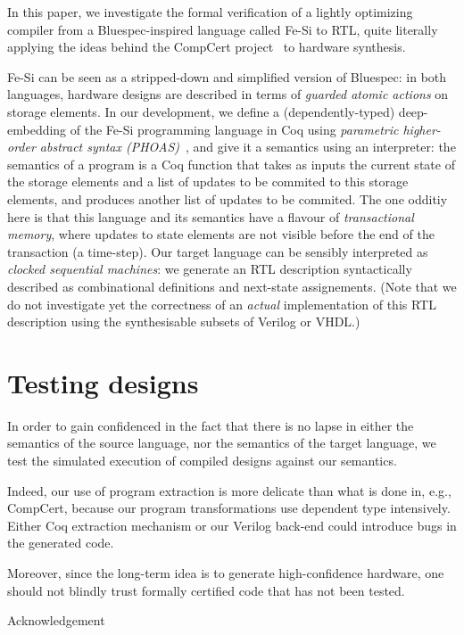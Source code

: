 \documentclass[preprint]{sigplanconf}
\newcommand{\project}{Fe-Si}
\begin{document}
\medskip In this paper, we investigate the formal verification of a
lightly optimizing compiler from a Bluespec-inspired language called
\project{} to RTL, quite literally applying the ideas behind the
CompCert project~\cite{Leroy-Compcert-CACM} to hardware synthesis.

\medskip

\project{} can be seen as a stripped-down and simplified version
of Bluespec: in both languages, hardware designs are described in
terms of \emph{guarded atomic actions} on storage elements. 
%
In our development, we define a (dependently-typed) deep-embedding of
the \project{} programming language in Coq using \emph{parametric
  higher-order abstract syntax (PHOAS)}~\cite{phoas-chlipala}, and
give it a semantics using an interpreter: the semantics of a program
is a Coq function that takes as inputs the current state of the
storage elements and a list of updates to be commited to this storage
elements, and produces another list of updates to be commited.
%
The one odditiy here is that this language and its semantics have a
flavour of \emph{transactional memory}, where updates to state
elements are not visible before the end of the transaction (a
time-step).
%
Our target language can be sensibly interpreted as \emph{clocked
  sequential machines}: we generate an RTL description syntactically
described as combinational definitions and next-state
assignements. (Note that we do not investigate yet the correctness of an
\emph{actual} implementation of this RTL description using the
synthesisable subsets of Verilog or VHDL.)


\section{Testing designs}
In order to gain confidenced in the fact that there is no lapse in
either the semantics of the source language, nor the semantics of the
target language, we test the simulated execution of compiled designs
against our semantics. 

Indeed, our use of program extraction is more delicate than what is
done in, e.g., CompCert, because our program transformations use
dependent type intensively. Either Coq extraction mechanism or
our Verilog back-end could introduce bugs in the generated code.

Moreover, since the long-term idea is to generate high-confidence
hardware, one should not blindly trust formally certified code that
has not been tested. 





\acks Acknowledgement



\end{document}
